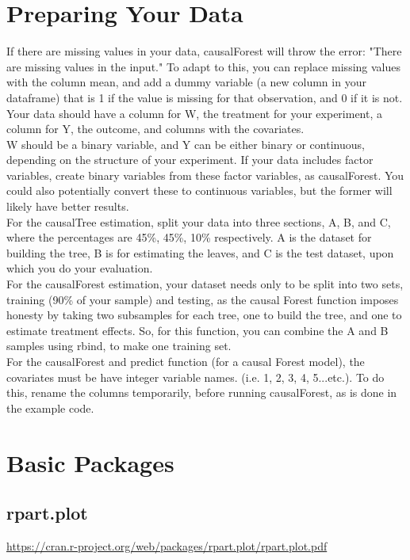 \documentclass{article}
\begin{document}
\section{Preparing Your Data}

If there are missing values in your data, causalForest will throw the error: "There are missing values in the input."
To adapt to this, you can replace missing values with the column mean, and add a dummy variable (a new column in your dataframe) that is 1 if the value is missing for that observation, and 0 if it is not.  \\

Your data should have a column for W, the treatment for your experiment, a column for Y, the outcome, and columns with the covariates. \\
W should be a binary variable, and Y can be either binary or continuous, depending on the structure of your experiment.
If your data includes factor variables, create binary variables from these factor variables, as causalForest. You could also potentially convert these to continuous variables, but the former will likely have better results.\\

For the causalTree estimation, split your data into three sections, A, B, and C, where the percentages are 45\%, 45\%, 10\% respectively. A is the dataset for building the tree, B is for estimating the leaves, and C is the test dataset, upon which you do your evaluation. \\

For the causalForest estimation, your dataset needs only to be split into two sets, training (90\% of your sample) and testing, as the causal Forest function imposes honesty by taking two subsamples for each tree, one to build the tree, and one to estimate treatment effects. So, for this function, you can combine the A and B samples using rbind, to make one training set.  \\

For the causalForest and predict function (for a causal Forest model), the covariates must be have integer variable names.  (i.e. 1, 2, 3, 4, 5...etc.). To do this, rename the columns temporarily, before running causalForest, as is done in the example code.  \\

\section{Basic Packages}
\subsection{rpart.plot } \url{https://cran.r-project.org/web/packages/rpart.plot/rpart.plot.pdf}
\end{document}

